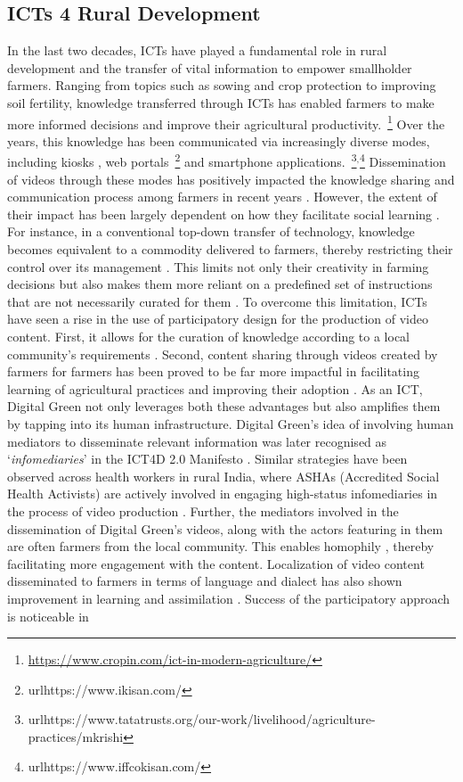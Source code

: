 \documentclass[manuscript,screen]{acmart}
\begin{document}
\subsection{ICTs 4 Rural Development}

In the last two decades, ICTs have played a fundamental role in rural development and the transfer of vital information to empower smallholder farmers. Ranging from topics such as sowing and crop protection to improving soil fertility, knowledge transferred through ICTs has enabled farmers to make more informed decisions and improve their agricultural productivity.~\footnote{\url{https://www.cropin.com/ict-in-modern-agriculture/}} Over the years, this knowledge has been communicated via increasingly diverse modes, including kiosks \cite{ishakti}, web portals~\footnote{url{https://www.ikisan.com/}} and smartphone applications.~\footnote{url{https://www.tatatrusts.org/our-work/livelihood/agriculture-practices/mkrishi}}$^{,}$\footnote{url{https://www.iffcokisan.com/}} Dissemination of videos through these modes has positively impacted the knowledge sharing and communication process among farmers in recent years \cite{4937421, rose2021videos, bentlay, farmingvlogs}. However, the extent of their impact has been largely dependent on how they facilitate social learning \cite{karubanga2017farmer}. For instance, in a conventional top-down transfer of technology, knowledge becomes equivalent to a commodity delivered to farmers, thereby restricting their control over its management \cite{cuellar2011can}. This limits not only their creativity in farming decisions but also makes them more reliant on a predefined set of instructions that are not necessarily curated for them \cite{pagliarino2020participatory, chambers1994farmer}. To overcome this limitation, ICTs have seen a rise in the use of participatory design for the production of video content. First, it allows for the curation of knowledge according to a local community’s requirements \cite{Gandhi, barakabitze2017use}. Second, content sharing through videos created by farmers for farmers has been proved to be far more impactful in facilitating learning of agricultural practices and improving their adoption \cite{zossou2012participatory}. As an ICT, Digital Green not only leverages both these advantages but also amplifies them by tapping into its human infrastructure. Digital Green’s idea of involving human mediators to disseminate relevant information was later recognised as ‘\textit{infomediaries}’ in the ICT4D 2.0 Manifesto \cite{ict4d2}. Similar strategies have been observed across health workers in rural India, where ASHAs (Accredited Social Health Activists) are actively involved in engaging high-status infomediaries in the process of video production \cite{ASHA}. Further, the mediators involved in the dissemination of Digital Green’s videos, along with the actors featuring in them are often farmers from the local community. This enables homophily \cite{Gandhi}, thereby facilitating more engagement with the content. Localization of video content disseminated to farmers in terms of language and dialect has also shown improvement in learning and assimilation \cite{educationalanimated, videomediatedrural}. Success of the participatory approach is noticeable in 
\end{document}
